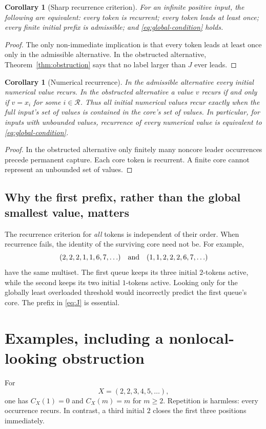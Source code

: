 \documentclass[11pt,letterpaper]{article}
\newtheorem{corollary}[theorem]{Corollary}
\theoremstyle{definition}
\newcommand{\core}{\mathcal R}
\begin{document}
\begin{corollary}[Sharp recurrence criterion]\label{cor:iff}
For an infinite positive input, the following are equivalent: every token
is recurrent; every token leads at least once; every finite initial prefix
is admissible; and \eqref{eq:global-condition} holds.
\end{corollary}
\begin{proof}
The only non-immediate implication is that every token leads at least once
only in the admissible alternative. In the obstructed alternative,
Theorem~\ref{thm:obstruction} says that no label larger than $J$ ever leads.
\end{proof}

\begin{corollary}[Numerical recurrence]\label{cor:numerical}
In the admissible alternative every initial numerical value recurs. In the
obstructed alternative a value $v$ recurs if and only if $v=x_i$ for some
$i\in\core$. Thus all initial numerical values recur exactly when the full
input's set of values is contained in the core's set of values. In particular,
for inputs with unbounded values, recurrence of every numerical value is
equivalent to \eqref{eq:global-condition}.
\end{corollary}
\begin{proof}
In the obstructed alternative only finitely many noncore leader occurrences
precede permanent capture. Each core token is recurrent. A finite core cannot
represent an unbounded set of values.
\end{proof}

\subsection{Why the first prefix, rather than the global smallest value, matters}
The recurrence criterion for \emph{all} tokens is independent of their order.
When recurrence fails, the identity of the surviving core need not be.
For example,
\[
 (2,2,2,1,1,6,7,\ldots)
 \quad\hbox{and}\quad
 (1,1,2,2,2,6,7,\ldots)
\]
have the same multiset. The first queue keeps its three initial $2$-tokens
active, while the second keeps its two initial $1$-tokens active. Looking only
for the globally least overloaded threshold would incorrectly predict the
first queue's core. The prefix in \eqref{eq:J} is essential.

\section{Examples, including a nonlocal-looking obstruction}\label{sec:examples}
For
\[
 X=(2,2,3,4,5,\ldots),
\]
one has $C_X(1)=0$ and $C_X(m)=m$ for $m\ge2$. Repetition is harmless:
every occurrence recurs. In contrast, a third initial $2$ closes the first
three positions immediately.
\end{document}
